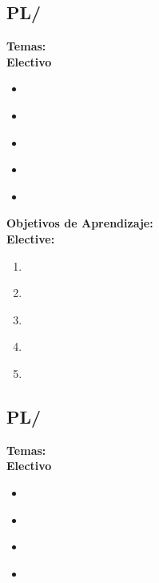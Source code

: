\subsection{PL/\PLLanguagePragmatics}\label{sec:BOK:PLLanguagePragmatics}
\noindent \textbf{Temas:}\\
\noindent \textbf{Electivo}
\begin{itemize}
	\item \PLLanguagePragmaticsTopicPrinciples\label{sec:BOK:PLLanguagePragmaticsTopicPrinciples}
	\item \PLLanguagePragmaticsTopicEvaluation\label{sec:BOK:PLLanguagePragmaticsTopicEvaluation}
	\item \PLLanguagePragmaticsTopicEager\label{sec:BOK:PLLanguagePragmaticsTopicEager}
	\item \PLLanguagePragmaticsTopicDefining\label{sec:BOK:PLLanguagePragmaticsTopicDefining}
	\item \PLLanguagePragmaticsTopicExternal\label{sec:BOK:PLLanguagePragmaticsTopicExternal}
\end{itemize}


\noindent \textbf{Objetivos de Aprendizaje:}\\
\noindent \textbf{Elective:}
\begin{enumerate}
	\setcounter{enumi}{0}
	\item \PLLanguagePragmaticsLODiscussTheConcepts\xspace[\PLLanguagePragmaticsLODiscussTheConceptsLevel]\label{sec:BOK:PLLanguagePragmaticsLODiscussTheConcepts}
	\item \PLLanguagePragmaticsLOUseCrisp\xspace[\PLLanguagePragmaticsLOUseCrispLevel]\label{sec:BOK:PLLanguagePragmaticsLOUseCrisp}
	\item \PLLanguagePragmaticsLOGiveAnWhose\xspace[\PLLanguagePragmaticsLOGiveAnWhoseLevel]\label{sec:BOK:PLLanguagePragmaticsLOGiveAnWhose}
	\item \PLLanguagePragmaticsLOShowUses\xspace[\PLLanguagePragmaticsLOShowUsesLevel]\label{sec:BOK:PLLanguagePragmaticsLOShowUses}
	\item \PLLanguagePragmaticsLODiscussTheAllowing\xspace[\PLLanguagePragmaticsLODiscussTheAllowingLevel]\label{sec:BOK:PLLanguagePragmaticsLODiscussTheAllowing}
\end{enumerate}


\subsection{PL/\PLLogicProgramming}\label{sec:BOK:PLLogicProgramming}
\noindent \textbf{Temas:}\\
\noindent \textbf{Electivo}
\begin{itemize}
	\item \PLLogicProgrammingTopicCausal\label{sec:BOK:PLLogicProgrammingTopicCausal}
	\item \PLLogicProgrammingTopicUnification\label{sec:BOK:PLLogicProgrammingTopicUnification}
	\item \PLLogicProgrammingTopicBactracking\label{sec:BOK:PLLogicProgrammingTopicBactracking}
	\item \PLLogicProgrammingTopicCuts\label{sec:BOK:PLLogicProgrammingTopicCuts}
\end{itemize}


